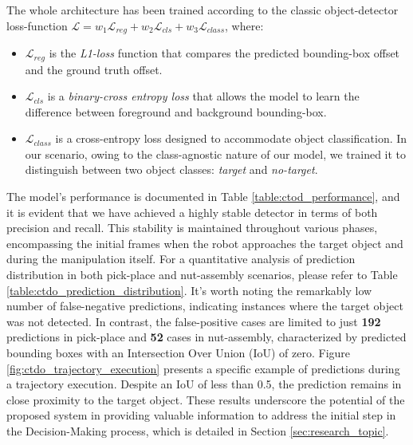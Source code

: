 The whole architecture has been trained according to the classic object-detector loss-function $\mathcal{L} = w_{1}\mathcal{L}_{reg} + w_{2}\mathcal{L}_{cls} + w_{3}\mathcal{L}_{class}$, where: \begin{itemize}
    \item $\mathcal{L}_{reg}$ is the \textit{L1-loss} function that compares the predicted bounding-box offset and the ground truth offset.
    \item $\mathcal{L}_{cls}$ is a \textit{binary-cross entropy loss} that allows the model to learn the difference between foreground and background bounding-box.
    \item $\mathcal{L}_{class}$ is a cross-entropy loss designed to accommodate object classification. In our scenario, owing to the class-agnostic nature of our model, we trained it to distinguish between two object classes: \textit{target} and \textit{no-target}.
\end{itemize}

The model's performance is documented in Table \ref{table:ctod_performance}, and it is evident that we have achieved a highly stable detector in terms of both precision and recall. This stability is maintained throughout various phases, encompassing the initial frames when the robot approaches the target object and during the manipulation itself. For a quantitative analysis of prediction distribution in both pick-place and nut-assembly scenarios, please refer to Table \ref{table:ctdo_prediction_distribution}. It's worth noting the remarkably low number of false-negative predictions, indicating instances where the target object was not detected. In contrast, the false-positive cases are limited to just \textbf{192} predictions in pick-place and \textbf{52} cases in nut-assembly, characterized by predicted bounding boxes with an Intersection Over Union (IoU) of zero. Figure \ref{fig:ctdo_trajectory_execution} presents a specific example of predictions during a trajectory execution. Despite an IoU of less than 0.5, the prediction remains in close proximity to the target object. These results underscore the potential of the proposed system in providing valuable information to address the initial step in the Decision-Making process, which is detailed in Section \ref{sec:research_topic}.


